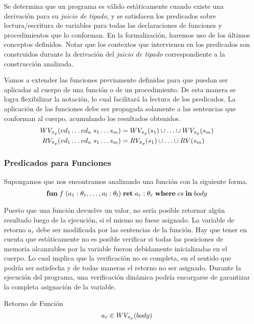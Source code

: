 Se determina que un programa es válido estáticamente cuando existe una derivación para su \textit{juicio de tipado}, y se satisfacen los predicados sobre lectura/escritura de variables para todas las declaraciones de funciones y procedimientos que lo conforman.
En la formalización, haremos uso de los últimos conceptos definidos.
Notar que los contextos que intervienen en los predicados son construidos durante la derivación del \textit{juicio de tipado} correspondiente a la construcción analizada.

Vamos a extender las funciones previamente definidas para que puedan ser aplicadas al cuerpo de una función o de un procedimiento.
De esta manera se logra flexibilizar la notación, lo cual facilitará la lectura de los predicados.
La aplicación de las funciones debe ser propagada solamente a las sentencias que conforman al cuerpo, acumulando los resultados obtenidos.
\begin{align*}
WV_{\pi_{p}}(vd_1 \ldots vd_n \; s_1 \ldots s_m) &= WV_{\pi_{p}}(s_1) \cup \ldots \cup WV_{\pi_{p}}(s_m)
\\
RV_{\pi_{p}}(vd_1 \ldots vd_n \; s_1 \ldots s_m) &= RV_{\pi_{p}}(s_1) \cup \ldots \cup RV(s_m)
\end{align*}

\subsubsection{Predicados para Funciones}

Supongamos que nos encontramos analizando una función con la siguiente forma.
\begin{gather*}
\mathbf{fun} \; f \; (a_1: \theta_1, \ldots, a_l: \theta_l) \; \mathbf{ret} \; a_r: \theta_r \; \mathbf{where} \; cs \; \mathbf{in} \; body
\end{gather*}

Puesto que una función devuelve un valor, no sería posible retornar algún resultado luego de la ejecución, si el mismo no fuese asignado.
La variable de retorno $a_r$ debe ser modificada por las sentencias de la función.
Hay que tener en cuenta que estáticamente no es posible verificar si todas las posiciones de memoria alcanzables por la variable fueron debidamente inicializadas en el cuerpo.
Lo cual implica que la verificación no es completa, en el sentido que podría ser satisfecha y de todas maneras el retorno no ser asignado.
Durante la ejecución del programa, una verificación dinámica podría encargarse de garantizar la completa asignación de la variable.

\begin{Predicado}
\label{PFRetorno}
Retorno de Función
\begin{gather*}
a_r \in WV_{\pi_{p}}(body)
\end{gather*}
\end{Predicado}

